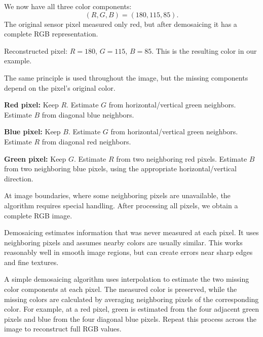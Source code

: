 {
We now have all three color components:
\[
\boxed{(R,G,B)=(180,115,85)}.
\]
The original sensor pixel measured only red, but after demosaicing it has a
complete RGB representation.

\begin{center}
\colorbox{reconstructed}{\rule{0pt}{20pt}\hspace{24pt}}
\end{center}
Reconstructed pixel: $R=180$, $G=115$, $B=85$.
This is the resulting color in our example.

The same principle is used throughout the image, but the missing components
depend on the pixel's original color.

\textbf{Red pixel:} Keep $R$.
Estimate $G$ from horizontal/vertical green neighbors.
Estimate $B$ from diagonal blue neighbors.

\textbf{Blue pixel:} Keep $B$.
Estimate $G$ from horizontal/vertical green neighbors.
Estimate $R$ from diagonal red neighbors.

\textbf{Green pixel:} Keep $G$.
Estimate $R$ from two neighboring red pixels.
Estimate $B$ from two neighboring blue pixels, using the appropriate
horizontal/vertical direction.

At image boundaries, where some neighboring pixels are unavailable, the
algorithm requires special handling.
After processing all pixels, we obtain a complete RGB image.

Demosaicing estimates information that was never measured at each pixel.
It uses neighboring pixels and assumes nearby colors are usually similar.
This works reasonably well in smooth image regions, but can create errors
near sharp edges and fine textures.

A simple demosaicing algorithm uses interpolation to estimate the two missing
color components at each pixel.
The measured color is preserved, while the missing colors are calculated by
averaging neighboring pixels of the corresponding color.
For example, at a red pixel, green is estimated from the four adjacent green
pixels and blue from the four diagonal blue pixels.
Repeat this process across the image to reconstruct full RGB values.
}

